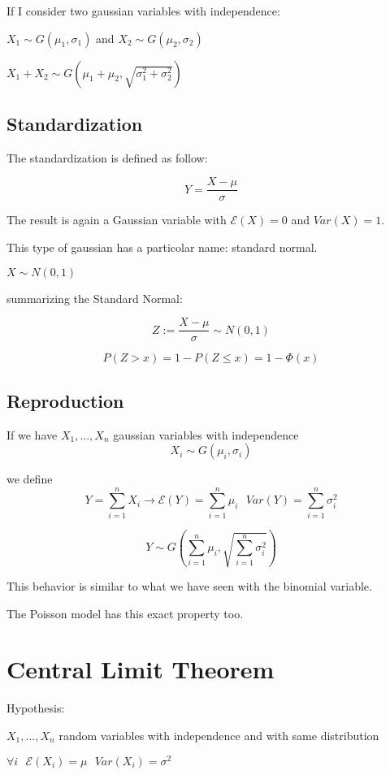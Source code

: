 \documentclass{article}
\begin{document}
\bigskip

If I consider two gaussian variables with independence:

$X_1 \sim G(\mu_1,\sigma_1)$ and $X_2 \sim G(\mu_2,\sigma_2)$

$X_1 + X_2 \sim G(\mu_1+\mu_2,\sqrt{\sigma_1^2 + \sigma_2^2})$

\subsection{Standardization}

The standardization is defined as follow:

$$Y = \frac{X - \mu}{\sigma}$$

The result is again a Gaussian variable with $\mathcal E(X) = 0$ and $Var(X) = 1$.

This type of gaussian has a particolar name: standard normal.

$X \sim N(0,1)$

\bigskip

summarizing the Standard Normal:

$$Z:= \frac{X -\mu}{\sigma} \sim N(0,1)$$

$$P(Z > x) = 1 - P(Z \leq x) = 1 - \Phi(x)$$

\subsection{Reproduction}

If we have $X_1,...,X_n$ gaussian variables with independence $$X_i \sim G(\mu_i,\sigma_i)$$

we define $$Y = \sum_{i=1}^n X_i \longrightarrow \mathcal E(Y) = \sum_{i=1}^n\mu_i \ \ \ Var(Y) = \sum_{i=1}^n \sigma_i^2$$

$$Y \sim G\left(\sum_{i=1}^n \mu_i, \sqrt{\sum_{i=1}^n \sigma_i^2}\right)$$

This behavior is similar to what we have seen with the binomial variable.

The Poisson model has this exact property too.

\section{Central Limit Theorem}

Hypothesis:

$X_1,...,X_n$ random variables with independence and with same distribution

$\forall i \ \ \ \mathcal E(X_i) = \mu \ \ \ Var(X_i) = \sigma^2$
\end{document}
